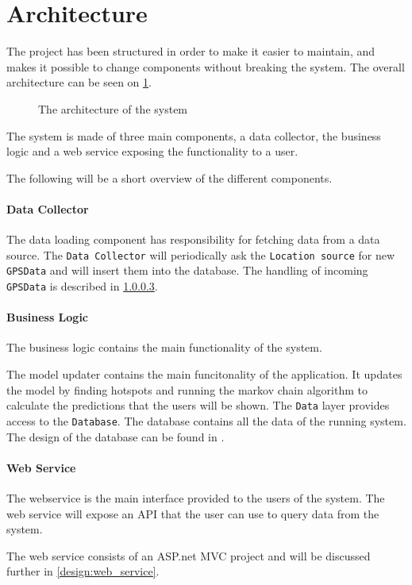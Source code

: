\section{Architecture}

The project has been structured in order to make it easier to maintain, and makes it possible to change components without breaking the system.
The overall architecture can be seen on \cref{arch}.

\begin{figure}[h]
\center

\caption{The architecture of the system}
\label{arch}
\end{figure}

The system is made of three main components, a data collector, the business logic and a web service exposing the functionality to a user.

The following will be a short overview of the different components.

\paragraph{Data Collector}

The data loading component has responsibility for fetching data from a data source.
The \texttt{Data Collector} will periodically ask the \texttt{Location source} for new \texttt{GPSData} and will insert them into the database. 
The handling of incoming \texttt{GPSData} is described in  \cref{}.

\paragraph{Business Logic}
The business logic contains the main functionality of the system.

The model updater contains the main funcitonality of the application.
It updates the model by finding hotspots and running the markov chain algorithm to calculate the predictions that the users will be shown.
The \texttt{Data} layer provides access to the \texttt{Database}.
The database contains all the data of the running system.
The design of the database can be found in .

\paragraph{Web Service}
The webservice is the main interface provided to the users of the system.
The web service will expose an API that the user can use to query data from the system.

The web service consists of an ASP.net MVC project and will be discussed further in \cref{design:web_service}.





